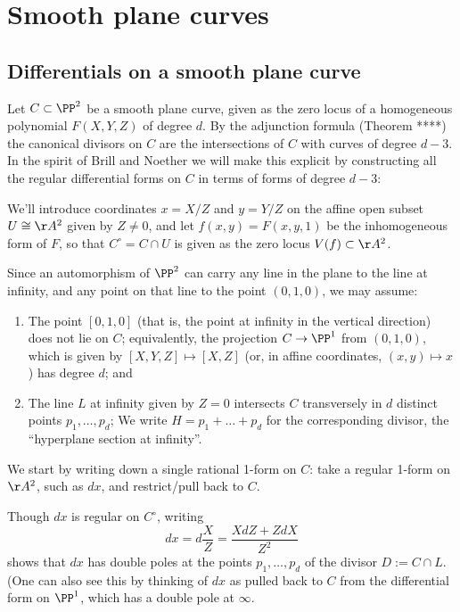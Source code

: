 \section{Smooth plane curves}

\subsection{Differentials on a smooth plane curve}\label{canonical series on smooth plane curves}

Let $C \subset \PP^2$  be a smooth plane curve, given as the zero locus of a homogeneous polynomial $F(X,Y,Z)$ of degree $d$. By the adjunction formula (Theorem ****) the canonical  divisors on $C$
are the intersections of $C$ with curves of degree $d-3$. In the spirit of Brill and Noether we
will make this explicit by constructing all
 the regular differential forms on $C$ in terms of forms of degree $d-3$:


We'll introduce coordinates $x = X/Z$ and $y = Y/Z$ on the affine open subset $U \cong \AA^2$ given by $Z \neq 0$, and let $f(x,y) = F(x, y,1)$ be the inhomogeneous form of $F$, so that $C^\circ = C \cap U$ is given as the zero locus $V(f) \subset  \AA^2$. 

Since an automorphism of $\PP^2$ can carry any line in the plane to the line at infinity, and any point on that line to the point $(0,1,0)$, we may assume:
\begin{enumerate}
\item The point $[0,1,0]$ (that is, the point at infinity in the vertical direction) does not lie on $C$; equivalently,  the projection $C \to \PP^1$ from $(0,1,0)$, which is given by $[X,Y,Z] \mapsto [X,Z]$ (or, in affine coordinates, $(x,y) \mapsto x$)  has degree $d$; and
\item The line $L$ at infinity given by $Z = 0$ intersects $C$ transversely in $d$ distinct points $p_1, \dots, p_d$; We write $H = p_1+ \dots +p_d$ for the corresponding divisor, the ``hyperplane section at infinity''.
\end{enumerate}
 

We start by writing down a single rational 1-form on $C$: 
 take a regular 1-form on $\AA^2$, such as $dx$, and restrict/pull back to $C$. 

Though $dx$ is regular on $C^\circ$, writing
$$
dx = d\frac{X}{Z} = \frac{X dZ+ Z dX}{Z^2}
$$
 shows that $dx$ has double poles at the points $p_1,\dots,p_d$ of the divisor $D := C \cap L$. (One can
 also see this by thinking of $dx$ as pulled back to $C$ from the differential form on $\PP^{1}$, which
 has a double pole at $\infty$.
 

